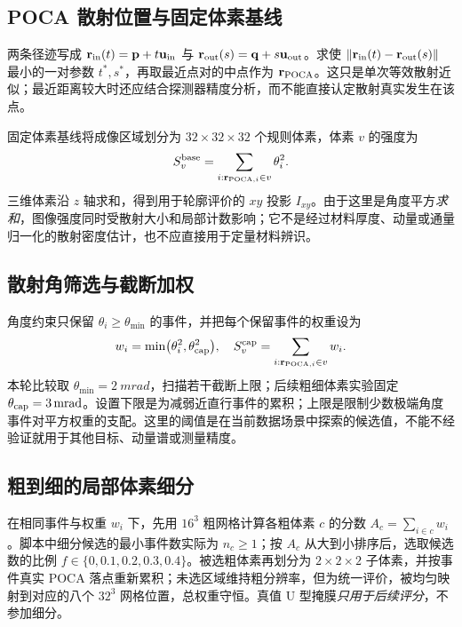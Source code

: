 \documentclass[UTF8,fontset=none,zihao=-4,a4paper]{ctexart}
\begin{document}
\subsection{POCA 散射位置与固定体素基线}
两条径迹写成 $\mathbf r_{\rm in}(t)=\mathbf p+t\mathbf u_{\rm in}$ 与 $\mathbf r_{\rm out}(s)=\mathbf q+s\mathbf u_{\rm out}$。求使 $\|\mathbf r_{\rm in}(t)-\mathbf r_{\rm out}(s)\|$ 最小的一对参数 $t^*,s^*$，再取最近点对的中点作为 $\mathbf r_{\rm POCA}$。这只是单次等效散射近似；最近距离较大时还应结合探测器精度分析，而不能直接认定散射真实发生在该点。

固定体素基线将成像区域划分为 $32\times32\times32$ 个规则体素，体素 $v$ 的强度为
\begin{equation}
S_v^{\rm base}=\sum_{i:\mathbf r_{{\rm POCA},i}\in v}\theta_i^2.
\label{eq:baseline}
\end{equation}
三维体素沿 $z$ 轴求和，得到用于轮廓评价的 $xy$ 投影 $I_{xy}$。由于这里是角度平方\emph{求和}，图像强度同时受散射大小和局部计数影响；它不是经过材料厚度、动量或通量归一化的散射密度估计，也不应直接用于定量材料辨识。

\subsection{散射角筛选与截断加权}
角度约束只保留 $\theta_i\ge\theta_{\min}$ 的事件，并把每个保留事件的权重设为
\begin{equation}
w_i=\min\bigl(\theta_i^2,\theta_{\rm cap}^2\bigr),\quad
S_v^{\rm cap}=\sum_{i:\mathbf r_{{\rm POCA},i}\in v}w_i.
\label{eq:cap}
\end{equation}
本轮比较取 $\theta_{\min}=\SI{2}{mrad}$，扫描若干截断上限；后续粗细体素实验固定 $\theta_{\rm cap}=\SI{3}{mrad}$。设置下限是为减弱近直行事件的累积；上限是限制少数极端角度事件对平方权重的支配。这里的阈值是在当前数据场景中探索的候选值，不能不经验证就用于其他目标、动量谱或测量精度。

\subsection{粗到细的局部体素细分}
在相同事件与权重 $w_i$ 下，先用 $16^3$ 粗网格计算各粗体素 $c$ 的分数 $A_c=\sum_{i\in c}w_i$。脚本中细分候选的最小事件数实际为 $n_c\ge1$；按 $A_c$ 从大到小排序后，选取候选数的比例 $f\in\{0,0.1,0.2,0.3,0.4\}$。被选粗体素再划分为 $2\times2\times2$ 子体素，并按事件真实 POCA 落点重新累积；未选区域维持粗分辨率，但为统一评价，被均匀映射到对应的八个 $32^3$ 网格位置，总权重守恒。真值 U 型掩膜\emph{只用于后续评分}，不参加细分。
\end{document}
